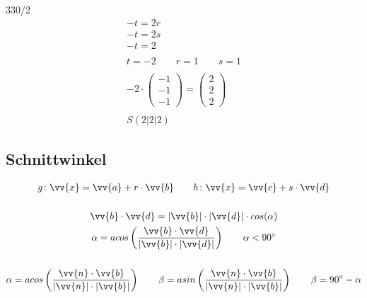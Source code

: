 \begin{exercise}{330/2}
\begin{gather*}
    -t = 2r \\
    -t = 2s \\
    -t = 2 \\\\
    t = -2 \qquad r = 1 \qquad s = 1 \\\\
    -2 \cdot \begin{pmatrix}-1 \\ -1 \\ -1\end{pmatrix} = \begin{pmatrix}2 \\ 2 \\ 2\end{pmatrix} \\\\
    S(2|2|2)
  \end{gather*}
\end{exercise}
\subsection{Schnittwinkel}
\begin{gather*}
  g \colon \vv{x} = \vv{a} + r \cdot \vv{b} \qquad h \colon \vv{x} = \vv{c} + s \cdot \vv{d} \\\\
  \vv{b} \cdot \vv{d} = |\vv{b}| \cdot |\vv{d}| \cdot cos(\alpha) \\
  \alpha = acos\left(\frac{\vv{b} \cdot \vv{d}}{|\vv{b}| \cdot |\vv{d}|}\right) \qquad \alpha < 90^\circ \\\\
  \alpha = acos\left(\frac{\vv{n} \cdot \vv{b}}{|\vv{n}| \cdot |\vv{b}|}\right) \qquad \beta = asin\left(\frac{\vv{n} \cdot \vv{b}}{|\vv{n}| \cdot |\vv{b}|}\right) \qquad \beta = 90^\circ - \alpha
\end{gather*}

